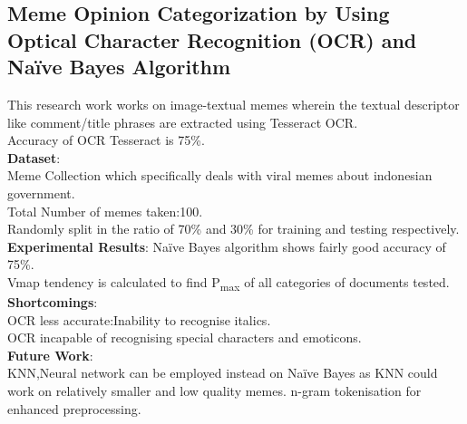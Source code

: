 \documentclass[12pt,a4paper]{article}
\begin{document}
\subsection{ Meme Opinion Categorization by Using Optical Character Recognition (OCR) and Na\"ive Bayes Algorithm\cite{memeOpinionOCR}}
This research work works on image-textual memes wherein the textual descriptor like comment/title phrases are extracted using Tesseract OCR.\\
Accuracy of OCR Tesseract is 75\%.\\
\textbf{Dataset}:\\
Meme Collection which specifically deals with viral memes about indonesian government.\\
Total Number of memes taken:100.\\
Randomly split in the ratio of 70\% and 30\% for training and testing respectively.\\
\textbf{Experimental Results}:
Na\"ive Bayes algorithm shows fairly good accuracy of 75\%.\\
Vmap tendency is calculated to find P\textsubscript{max} of all categories of
documents tested.\\
\textbf{Shortcomings}:\\
OCR less accurate:Inability to recognise italics.\\
OCR incapable of recognising special characters and emoticons.\\
\textbf{Future Work}:\\KNN,Neural network can be employed instead on Na\"ive Bayes as KNN could work on relatively smaller and low quality memes.
n-gram tokenisation for
enhanced preprocessing.
\end{document}
